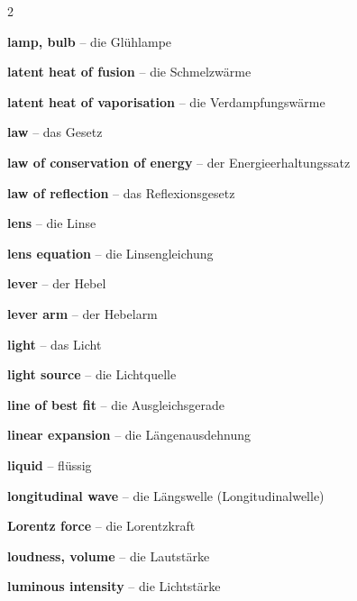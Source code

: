 \begin{multicols}{2}
\par\nopagebreak
\textbf{lamp, bulb} -- die Glühlampe\dotfill\hyperref[e:158]{\pageref*{e:158}}\par
\textbf{latent heat of fusion} -- die Schmelzwärme\dotfill\hyperref[e:137]{\pageref*{e:137}}\par
\textbf{latent heat of vaporisation} -- die Verdampfungswärme\dotfill\hyperref[e:138]{\pageref*{e:138}}\par
\textbf{law} -- das Gesetz\dotfill\hyperref[e:21]{\pageref*{e:21}}\par
\textbf{law of conservation of energy} -- der Energieerhaltungssatz\dotfill\hyperref[e:104]{\pageref*{e:104}}\par
\textbf{law of reflection} -- das Reflexionsgesetz\dotfill\hyperref[e:228]{\pageref*{e:228}}\par
\textbf{lens} -- die Linse\dotfill\hyperref[e:240]{\pageref*{e:240}}\par
\textbf{lens equation} -- die Linsengleichung\dotfill\hyperref[e:248]{\pageref*{e:248}}\par
\textbf{lever} -- der Hebel\dotfill\hyperref[e:82]{\pageref*{e:82}}\par
\textbf{lever arm} -- der Hebelarm\dotfill\hyperref[e:83]{\pageref*{e:83}}\par
\textbf{light} -- das Licht\dotfill\hyperref[e:220]{\pageref*{e:220}}\par
\textbf{light source} -- die Lichtquelle\dotfill\hyperref[e:221]{\pageref*{e:221}}\par
\textbf{line of best fit} -- die Ausgleichsgerade\dotfill\hyperref[e:24]{\pageref*{e:24}}\par
\textbf{linear expansion} -- die Längenausdehnung\dotfill\hyperref[e:139]{\pageref*{e:139}}\par
\textbf{liquid} -- flüssig\dotfill\hyperref[e:127]{\pageref*{e:127}}\par
\textbf{longitudinal wave} -- die Längswelle (Longitudinalwelle)\dotfill\hyperref[e:206]{\pageref*{e:206}}\par
\textbf{Lorentz force} -- die Lorentzkraft\dotfill\hyperref[e:185]{\pageref*{e:185}}\par
\textbf{loudness, volume} -- die Lautstärke\dotfill\hyperref[e:215]{\pageref*{e:215}}\par
\textbf{luminous intensity} -- die Lichtstärke\dotfill\hyperref[e:257]{\pageref*{e:257}}\par


\end{multicols}
